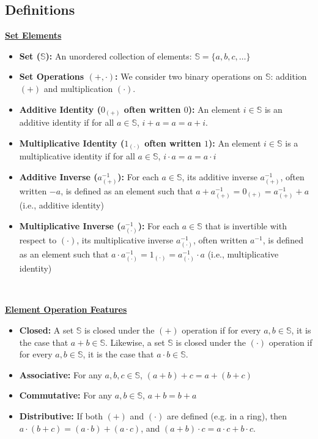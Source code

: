 
\subsection{Definitions}
\label{subsec:group-def}


\begin{tcolorbox}[title={\textbf{\tboxdef{\ref*{subsec:group-def}} Group}}]
\noindent \textbf{\underline{Set Elements}}
\begin{itemize}
\item \textbf{Set ($\mathbb{S}$):} An unordered collection of elements: $\mathbb{S} = \{a, b, c, \ldots\}$
\item \textbf{Set Operations $\bm{(+, \cdot)}$:} We consider two binary operations on $\mathbb{S}$: addition $(+)$ and multiplication $(\cdot)$.
\item \textbf{Additive Identity ($0_{(+)}$ often written $0$):} An element $i \in \mathbb{S}$ is an additive identity if for all $a \in \mathbb{S}$, $i + a = a = a + i$.
\item \textbf{Multiplicative Identity ($1_{(\cdot)}$ often written $1$):} An element $i \in \mathbb{S}$ is a multiplicative identity if for all $a \in \mathbb{S}$, $i \cdot a = a = a \cdot i$
\item \textbf{Additive Inverse ($a^{-1}_{(+)}$):} For each $a \in \mathbb{S}$, its additive inverse $a^{-1}_{(+)}$, often written $-a$, is defined as an element such that $a + a^{-1}_{(+)} = 0_{(+)} = a^{-1}_{(+)} + a$ (i.e., additive identity)
\item \textbf{Multiplicative Inverse ($a^{-1}_{(\cdot)}$):} For each $a \in \mathbb{S}$ that is invertible with respect to $(\cdot)$, its multiplicative inverse $a^{-1}_{(\cdot)}$, often written $a^{-1}$, is defined as an element such that $a \cdot a^{-1}_{(\cdot)} = 1_{(\cdot)} = a^{-1}_{(\cdot)} \cdot a$ (i.e., multiplicative identity)
\end{itemize}

$ $

\noindent \textbf{\underline{Element Operation Features}}
\begin{itemize}
\item \textbf{Closed:} A set $\mathbb{S}$ is closed under the $(+)$ operation if for every $a, b \in \mathbb{S}$, it is the case that $a + b \in \mathbb{S}$. Likewise, a set $\mathbb{S}$ is closed under the $(\cdot)$ operation if for every $a, b \in \mathbb{S}$, it is the case that $a \cdot b \in \mathbb{S}$. 
\item \textbf{Associative:} For any $a,b,c \in \mathbb{S}$, $(a + b) + c = a + (b + c)$
\item \textbf{Commutative:} For any $a,b \in \mathbb{S}$, $a + b = b + a$
\item \textbf{Distributive:} If both $(+)$ and $(\cdot)$ are defined (e.g. in a ring), then $a \cdot (b + c) = (a \cdot b) + (a \cdot c)$, and $(a + b) \cdot c = a\cdot c + b\cdot c$.
\end{itemize}



\end{tcolorbox}
